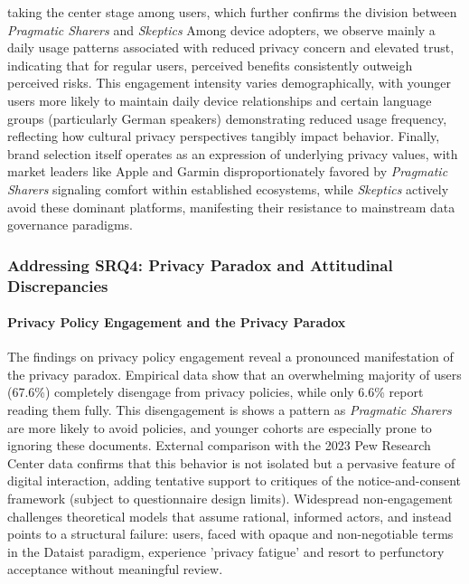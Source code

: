 taking the center stage among users, which further confirms the division between \textit{Pragmatic Sharers} and \textit{Skeptics} Among device adopters, we observe mainly a daily usage patterns associated with reduced privacy concern and elevated trust, indicating that for regular users, perceived benefits consistently outweigh perceived risks. This engagement intensity varies demographically, with younger users more likely to maintain daily device relationships and certain language groups (particularly German speakers) demonstrating reduced usage frequency, reflecting how cultural privacy perspectives tangibly impact behavior. Finally, brand selection itself operates as an expression of underlying privacy values, with market leaders like Apple and Garmin disproportionately favored by \textit{Pragmatic Sharers} signaling comfort within established ecosystems, while \textit{Skeptics} actively avoid these dominant platforms, manifesting their resistance to mainstream data governance paradigms.
	\subsubsection{Addressing SRQ4: Privacy Paradox and Attitudinal Discrepancies}

	\paragraph{Privacy Policy Engagement and the Privacy Paradox}
	The findings on privacy policy engagement reveal a pronounced manifestation of the privacy paradox. Empirical data show that an overwhelming majority of users (67.6\%) completely disengage from privacy policies, while only 6.6\% report reading them fully. This disengagement is shows a pattern as \textit{Pragmatic Sharers} are more likely to avoid policies, and younger cohorts are especially prone to ignoring these documents.
	External comparison with the 2023 Pew Research Center data confirms that this behavior is not isolated but a pervasive feature of digital interaction, adding tentative support to critiques of the notice-and-consent framework (subject to questionnaire design limits). Widespread non-engagement challenges theoretical models that assume rational, informed actors, and instead points to a structural failure: users, faced with opaque and non-negotiable terms in the Dataist paradigm, experience 'privacy fatigue' and resort to perfunctory acceptance without meaningful review.

